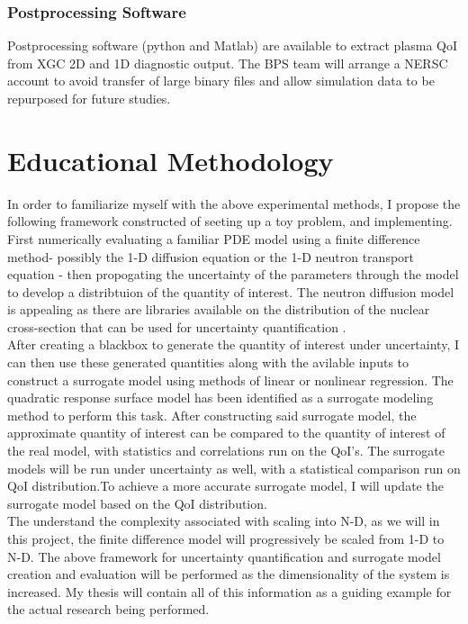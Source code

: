 \documentclass{article}
\begin{document}
\subsubsection*{Postprocessing Software}
Postprocessing software (python and Matlab) are available to extract plasma QoI from  XGC 2D and 1D diagnostic output.  The BPS team will
arrange a NERSC account to avoid transfer of large binary files and allow simulation data to be repurposed for future studies.
\section{Educational Methodology}
In order to familiarize myself with the above experimental methods, I propose the following framework constructed of seeting up a toy problem, and implementing. First numerically evaluating a familiar PDE model using a finite difference method-  possibly the 1-D diffusion equation or the 1-D neutron transport equation - then propogating the uncertainty of the parameters through the model to develop a distribtuion of the quantity of interest. The neutron diffusion model is appealing as there are libraries available on the distribution of the nuclear cross-section that can be used for uncertainty quantification \cite{Smith}.\\
After creating a blackbox to generate the quantity of interest under uncertainty, I can then use these generated quantities along with the avilable inputs to construct a surrogate model using methods of linear or nonlinear regression. The quadratic response surface model has been identified as a surrogate modeling method to perform this task. After constructing said surrogate model, the approximate quantity of interest can be compared to the quantity of interest of the real model, with statistics and correlations run on the QoI's. The surrogate models will be run under uncertainty as well, with a statistical comparison run on QoI distribution.To achieve a more accurate surrogate model, I will update the surrogate model based on the QoI distribution.\\
The understand the complexity associated with scaling into N-D, as we will in this project, the finite difference model will progressively be scaled from 1-D to N-D. The above framework for uncertainty quantification and surrogate model creation and evaluation will be performed as the dimensionality of the system is increased. My thesis will contain all of this information as a guiding example for the actual research being performed.\\
\end{document}
